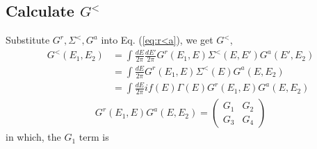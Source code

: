 \documentclass[11pt,a4paper]{article}
\begin{document}
\subsection{Calculate $G^{<}$}
Substitute $G^{r}, \Sigma^{<}, G^{a}$ into Eq. (\ref{eq:r<a}), we get $G^{<}$,
\begin{equation}
\begin{split}
G^{<}(E_{1},E_{2})&=\int\frac{dE}{2\pi}\frac{dE'}{2\pi}G^{r}(E_{1}, E) \Sigma^{<}(E, E') G^{a}(E', E_{2}) \\
&= \int \frac{dE}{2\pi} G^{r}\left(E_{1}, E\right) \Sigma^{<}\left(E\right) G^{a}\left(E, E_{2}\right) \\
&= \int \frac{dE}{2\pi} if(E)\Gamma(E) G^{r}\left(E_{1}, E\right) G^{a}\left(E, E_{2}\right)
\end{split}
\end{equation}
\begin{equation}
\begin{split}
G^{r}\left(E_{1}, E\right) G^{a}\left(E, E_{2}\right) =
\left(\begin{array}{cc}
G_{1} & G_{2} \\
G_{3} & G_{4}
\end{array}\right)
\end{split}
\end{equation}
in which, the $G_{1}$ term is
\end{document}
